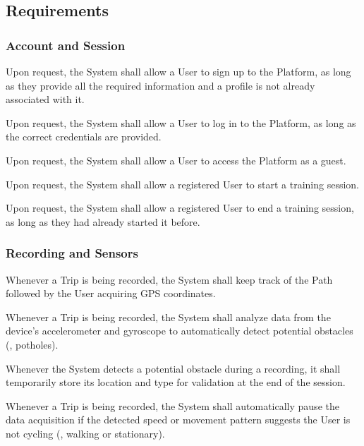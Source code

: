\subsection{Requirements}

\subsubsection*{Account and Session}
\begin{rlist}
    \item Upon request, the System shall allow a User to sign up to the Platform, as long as they provide all the required information and a profile is not already associated with it.
    \item Upon request, the System shall allow a User to log in to the Platform, as long as the correct credentials are provided.
    \item Upon request, the System shall allow a User to access the Platform as a guest.
    \item Upon request, the System shall allow a registered User to start a training session.
    \item Upon request, the System shall allow a registered User to end a training session, as long as they had already started it before.
\end{rlist}

\subsubsection*{Recording and Sensors}
\begin{rlist}[resume]
    \item Whenever a Trip is being recorded, the System shall keep track of the Path followed by the User acquiring GPS coordinates.
    \item Whenever a Trip is being recorded, the System shall analyze data from the device's accelerometer and gyroscope to automatically detect potential obstacles (\eg, potholes).
    \item Whenever the System detects a potential obstacle during a recording, it shall temporarily store its location and type for validation at the end of the session.
    \item Whenever a Trip is being recorded, the System shall automatically pause the data acquisition if the detected speed or movement pattern suggests the User is not cycling (\eg, walking or stationary).
\end{rlist}

